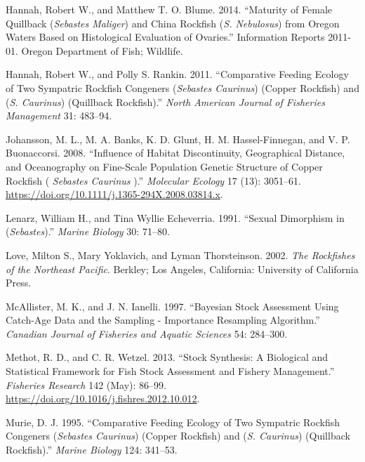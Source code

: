 \documentclass[11pt,
  english,
  a4paper,
]{article}
\begin{document}
\leavevmode\hypertarget{ref-HannahandBlume_maturity_2011}{}%
Hannah, Robert W., and Matthew T. O. Blume. 2014. ``Maturity of Female Quillback (\emph{Sebastes Maliger}) and China Rockfish (\emph{S. Nebulosus}) from Oregon Waters Based on Histological Evaluation of Ovaries.'' Information Reports 2011-01. Oregon Department of Fish; Wildlife.

\leavevmode\hypertarget{ref-HannahandRankin_rockfish_site_fidelity_2011}{}%
Hannah, Robert W., and Polly S. Rankin. 2011. ``Comparative Feeding Ecology of Two Sympatric Rockfish Congeners (\emph{Sebastes Caurinus}) (Copper Rockfish) and (\emph{S. Caurinus}) (Quillback Rockfish).'' \emph{North American Journal of Fisheries Management} 31: 483--94.

\leavevmode\hypertarget{ref-johansson_influence_2008}{}%
Johansson, M. L., M. A. Banks, K. D. Glunt, H. M. Hassel-Finnegan, and V. P. Buonaccorsi. 2008. ``Influence of Habitat Discontinuity, Geographical Distance, and Oceanography on Fine-Scale Population Genetic Structure of Copper Rockfish ( \emph{Sebastes Caurinus} ).'' \emph{Molecular Ecology} 17 (13): 3051--61. \url{https://doi.org/10.1111/j.1365-294X.2008.03814.x}.

\leavevmode\hypertarget{ref-LenarzandEcheverria_dimorphism_1991}{}%
Lenarz, William H., and Tina Wyllie Echeverria. 1991. ``Sexual Dimorphism in (\emph{Sebastes}).'' \emph{Marine Biology} 30: 71--80.

\leavevmode\hypertarget{ref-loveetal_2002}{}%
Love, Milton S., Mary Yoklavich, and Lyman Thorsteinson. 2002. \emph{The Rockfishes of the Northeast Pacific}. Berkley; Los Angeles, California: University of California Press.

\leavevmode\hypertarget{ref-mcallister_bayesian_1997}{}%
McAllister, M. K., and J. N. Ianelli. 1997. ``Bayesian Stock Assessment Using Catch-Age Data and the Sampling - Importance Resampling Algorithm.'' \emph{Canadian Journal of Fisheries and Aquatic Sciences} 54: 284--300.

\leavevmode\hypertarget{ref-methot_stock_2013}{}%
Methot, R. D., and C. R. Wetzel. 2013. ``Stock Synthesis: A Biological and Statistical Framework for Fish Stock Assessment and Fishery Management.'' \emph{Fisheries Research} 142 (May): 86--99. \url{https://doi.org/10.1016/j.fishres.2012.10.012}.

\leavevmode\hypertarget{ref-Murie_diet_1995}{}%
Murie, D. J. 1995. ``Comparative Feeding Ecology of Two Sympatric Rockfish Congeners (\emph{Sebastes Caurinus}) (Copper Rockfish) and (\emph{S. Caurinus}) (Quillback Rockfish).'' \emph{Marine Biology} 124: 341--53.
\end{document}
